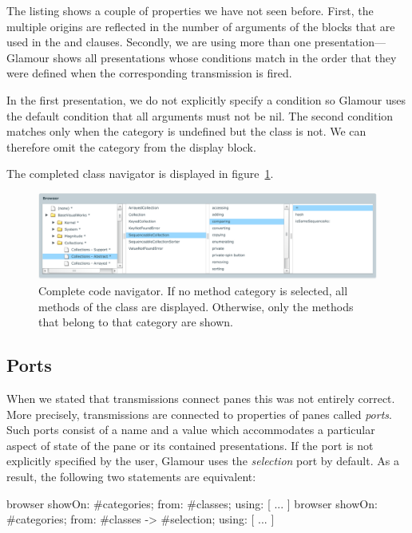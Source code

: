 \documentclass[a4paper,10pt,twoside]{book}
\begin{document}
The listing shows a couple of properties we have not seen
before. First, the multiple origins are reflected in the number of
arguments of the blocks that are used in the  and
 clauses. Secondly, we are using more than one
presentation---Glamour shows all presentations whose conditions match in
the order that they were defined when the corresponding transmission
is fired.

In the first presentation, we do not explicitly specify a condition so Glamour uses the default condition that all arguments must not be nil. The second condition matches only when the category is undefined but the class is not. We can therefore omit the category from the display block.

The completed class navigator is displayed in figure~\ref{fig:codenavigator}.

\begin{figure}[htbp]
\centerline{\includegraphics[width=\linewidth]{codenavigator.pdf}}
\caption{Complete code navigator. If no method category is selected, all methods of the class
are displayed. Otherwise, only the methods that belong to that category are shown.}
\label{fig:codenavigator}
\end{figure}


\subsection{Ports}

When we stated that transmissions connect panes this was not entirely correct. More precisely, transmissions are connected to properties of panes called \emph{ports}. Such ports consist of  a name and a value which accommodates a particular aspect of state of the pane or its contained presentations. If the port is not explicitly specified by the user, Glamour uses the \emph{selection} port by default. As a result, the following two statements are equivalent:

\begin{code}{}
browser showOn: #categories; from: #classes; using: [ ... ]
browser showOn: #categories; from: #classes -> #selection; using: [ ... ]
\end{code}
\end{document}
